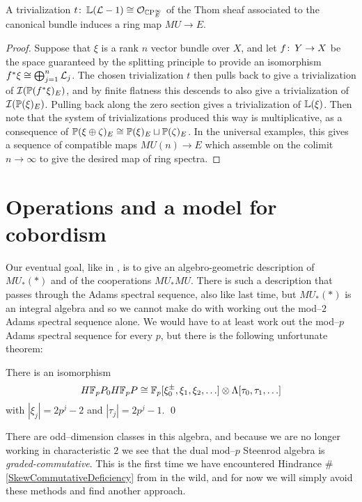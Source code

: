 \begin{theorem}
A trivialization $t\co \ThomSheaf{\L - 1} \cong \sheaf O_{\CP^\infty_E}$ of the Thom sheaf associated to the canonical bundle induces a ring map $MU \to E$.
\end{theorem}
\begin{proof}
Suppose that $\xi$ is a rank $n$ vector bundle over $X$, and let $f\co Y \to X$ be the space guaranteed by the splitting principle to provide an isomorphism $f^* \xi \cong \bigoplus_{j=1}^n \L_j$.  The chosen trivialization $t$ then pulls back to give a trivialization of $\sheaf I(\P(f^* \xi)_E)$, and by finite flatness this descends to also give a trivialization of $\sheaf I(\P(\xi)_E)$.  Pulling back along the zero section gives a trivialization of $\ThomSheaf{\xi}$.  Then note that the system of trivializations produced this way is multiplicative, as a consequence of $\P(\xi \oplus \zeta)_E \cong \P(\xi)_E \sqcup \P(\zeta)_E$.  In the universal examples, this gives a sequence of compatible maps $MU(n) \to E$ which assemble on the colimit $n \to \infty$ to give the desired map of ring spectra.
\end{proof}













\section{Operations and a model for cobordism}

Our eventual goal, like in , is to give an algebro-geometric description of $MU_*(*)$ and of the cooperations $MU_* MU$.  There is such a description that passes through the Adams spectral sequence, also like last time, but $MU_*(*)$ is an integral algebra and so we cannot make do with working out the mod--$2$ Adams spectral sequence alone.  We would have to at least work out the mod--$p$ Adams spectral sequence for every $p$, but there is the following unfortunate theorem:
\begin{theorem}
There is an isomorphism
\[H\F_pP_0 H\F_pP \cong \F_p[\xi_0^\pm, \xi_1, \xi_2, \ldots] \otimes \Lambda[\tau_0, \tau_1, \ldots]\]
with $|\xi_j| = 2p^j-2$ and $|\tau_j| = 2p^j - 1$. \qed
\end{theorem}
\noindent There are odd--dimension classes in this algebra, and because we are no longer working in characteristic $2$ we see that the dual mod--$p$ Steenrod algebra is \emph{graded-commutative}.  This is the first time we have encountered Hindrance \#\ref{SkewCommutativeDeficiency} from  in the wild, and for now we will simply avoid these methods and find another approach.

